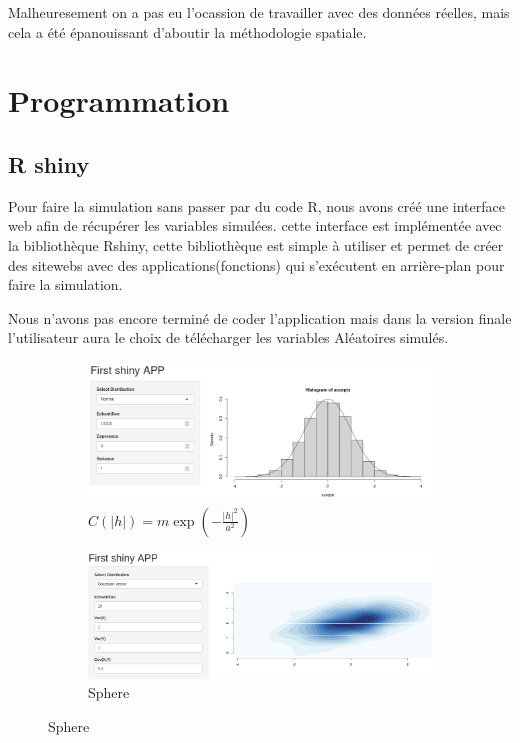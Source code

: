 \documentclass[10pt]{article} %
\begin{document}
Malheuresement on a pas eu l'ocassion de travailler avec des données réelles, mais cela a été épanouissant d'aboutir la méthodologie spatiale.


\section{Programmation}
\subsection{R shiny}

Pour faire la simulation sans passer par du code R, nous avons créé une interface web afin de récupérer les variables simulées.
cette interface est implémentée avec la bibliothèque Rshiny, cette bibliothèque est simple à utiliser et permet de créer des sitewebs
avec des applications(fonctions) qui s'exécutent en arrière-plan pour faire la simulation.

Nous n'avons pas encore terminé de coder l'application mais dans la version finale l'utilisateur aura le choix de télécharger les variables
Aléatoires simulés.

\begin{figure}[h!]
    \centering
    \begin{subfigure}[b]{0.48\textwidth}
        \centering
        \includegraphics[width=\textwidth]{media/apppic1.png}
        \caption{$C(|h|) = m \exp(-\frac{|h|^2}{a^2})$}
        \label{gauss plasma}
    \end{subfigure}
    \hfill
    \begin{subfigure}[b]{0.48\textwidth}
        \centering
        \includegraphics[width=\textwidth]{media/rshiny_gauss.png}
        \caption{Sphere}
        \label{fig:three sin x}
    \end{subfigure}
\end{figure}
\end{document}
